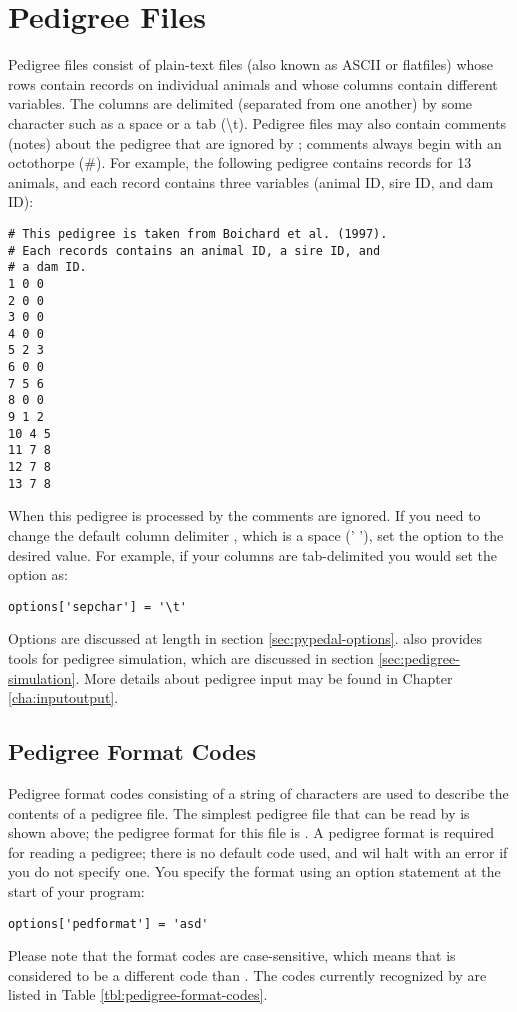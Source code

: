 \section{Pedigree Files}
\label{sec:pedigree-files}
Pedigree files consist of plain-text files (also known as ASCII or flatfiles) whose rows contain
records on individual animals and whose columns contain different variables.  The columns are
delimited (separated from one another) by some character such as a space or a tab (\textbackslash{}t).  Pedigree
files may also contain comments (notes) about the pedigree that are ignored by \PyPedal{}; comments
always begin with an octothorpe (\#).  For example, the following pedigree contains records for 13
animals, and each record contains three variables (animal ID, sire ID, and dam ID):
\begin{verbatim}
# This pedigree is taken from Boichard et al. (1997).
# Each records contains an animal ID, a sire ID, and
# a dam ID.
1 0 0
2 0 0
3 0 0
4 0 0
5 2 3
6 0 0
7 5 6
8 0 0
9 1 2
10 4 5
11 7 8
12 7 8
13 7 8
\end{verbatim}
When this pedigree is processed by \PyPedal{} the comments are ignored.  If you need to change the
default column delimiter , which is a space (' '), set the  option to the desired
value.  For example, if your columns are tab-delimited you would set the option as:
\begin{verbatim}
options['sepchar'] = '\t'
\end{verbatim}
Options are discussed at length in section \ref{sec:pypedal-options}. \PyPedal{} also provides tools for pedigree simulation, which are discussed in section \ref{sec:pedigree-simulation}. More details about pedigree input may be found in Chapter \ref{cha:inputoutput}.
\subsection{Pedigree Format Codes}
\label{sec:pedigree-format-codes}
Pedigree format codes consisting of a string of characters are used to describe
the contents of a pedigree file.  The simplest pedigree file that can be read by \PyPedal{}
is shown above; the pedigree format for this file is .  A pedigree format is required
for reading a pedigree; there is no default code used, and \PyPedal{} wil halt with an error if you
do not specify one.  You specify the format using an option statement at the start of your program:
\begin{verbatim}
options['pedformat'] = 'asd'
\end{verbatim}
Please note that the format codes are case-sensitive, which means that  is considered to be a different code than .  The codes currently recognized by \PyPedal{} are listed in Table \ref{tbl:pedigree-format-codes}.

